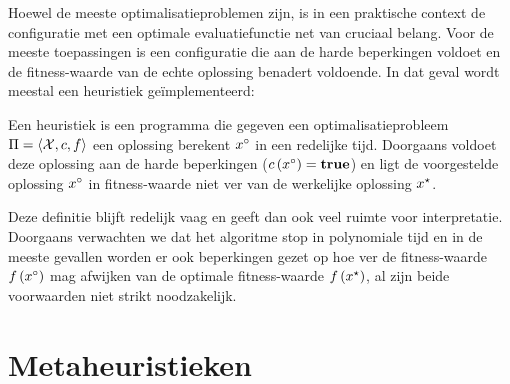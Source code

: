 Hoewel de meeste optimalisatieproblemen  zijn, is in een praktische context de configuratie met een optimale evaluatiefunctie net van cruciaal belang. Voor de meeste toepassingen is een configuratie die aan de harde beperkingen voldoet en de fitness-waarde van de echte oplossing benadert voldoende. In dat geval wordt meestal een heuristiek ge\"implementeerd:

\begin{definition}[Heuristiek]
Een heuristiek is een programma die gegeven een optimalisatieprobleem $\Pi=\left\langle \mathcal{X},c,f\right\rangle$ een oplossing berekent $x^{\circ}$ in een redelijke tijd. Doorgaans voldoet deze oplossing aan de harde beperkingen ($c\left(x^{\circ}\right)=\mbox{\textbf{true}}$) en ligt de voorgestelde oplossing $x^{\circ}$ in fitness-waarde niet ver van de werkelijke oplossing $x^{\star}$.
\end{definition}

Deze definitie blijft redelijk vaag en geeft dan ook veel ruimte voor interpretatie. Doorgaans verwachten we dat het algoritme stop in polynomiale tijd en in de meeste gevallen worden er ook beperkingen gezet op hoe ver de fitness-waarde $f\left(x^{\circ}\right)$ mag afwijken van de optimale fitness-waarde $f\left(x^{\star}\right)$, al zijn beide voorwaarden niet strikt noodzakelijk.




\section{Metaheuristieken}

